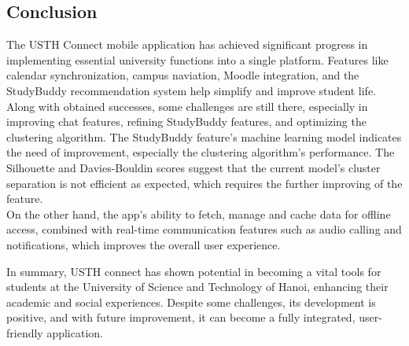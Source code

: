 \documentclass[12pt]{article}
\begin{document}
\subsection{Conclusion}
The USTH Connect mobile application has achieved significant progress in implementing essential university functions into a single platform. Features like calendar synchronization, campus naviation, Moodle integration, and the StudyBuddy recommendation system help simplify and improve student life.
Along with obtained successes, some challenges are still there, especially in improving chat features, refining StudyBuddy features, and optimizing the clustering algorithm.
The StudyBuddy feature's machine learning model indicates the need of improvement, especially the clustering algorithm's performance. The Silhouette and Davies-Bouldin scores suggest that the current model's cluster separation is not efficient as expected, which requires the further improving of the feature. \\

On the other hand, the app's ability to fetch, manage and cache data for offline access, combined with real-time communication features such as audio calling and notifications, which improves the overall user experience.

In summary, USTH connect has shown potential in becoming a vital tools for students at the University of Science and Technology of Hanoi, enhancing their academic and social experiences. 
Despite some challenges, its development is positive, and with future improvement, it can become a fully integrated, user-friendly application.
\end{document}
